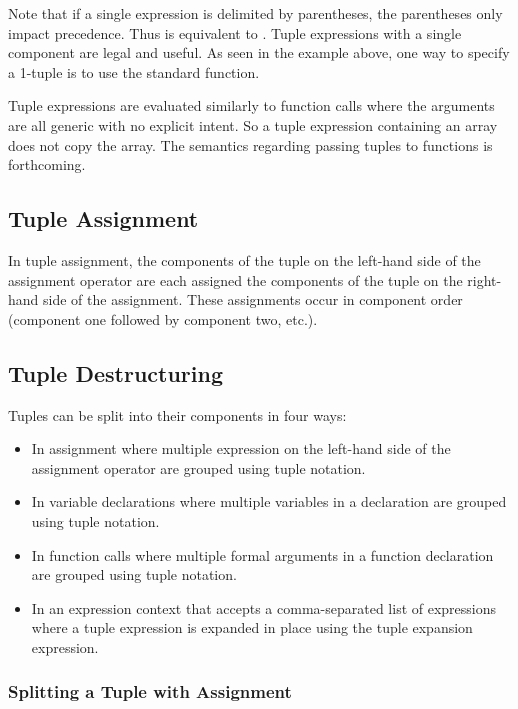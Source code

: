 Note that if a single expression is delimited by parentheses, the
parentheses only impact precedence.  Thus  is equivalent
to .  Tuple expressions with a single component are legal and
useful.  As seen in the example above, one way to specify a 1-tuple is
to use the standard  function.

Tuple expressions are evaluated similarly to function calls where the
arguments are all generic with no explicit intent.  So a tuple
expression containing an array does not copy the array.  The semantics
regarding passing tuples to functions is forthcoming.

\subsection{Tuple Assignment}
\label{Tuple_Assignment}

In tuple assignment, the components of the tuple on the left-hand side
of the assignment operator are each assigned the components of the
tuple on the right-hand side of the assignment.  These assignments
occur in component order (component one followed by component two,
etc.).

\subsection{Tuple Destructuring}
\label{Tuple_Destructuring}

Tuples can be split into their components in four ways:
\begin{itemize}
\item In assignment where multiple expression on the left-hand side of
the assignment operator are grouped using tuple notation.
\item In variable declarations where multiple variables in a
declaration are grouped using tuple notation.
\item In function calls where multiple formal arguments in a function
declaration are grouped using tuple notation.
\item In an expression context that accepts a comma-separated list of
expressions where a tuple expression is expanded in place using the
tuple expansion expression.
\end{itemize}

\subsubsection{Splitting a Tuple with Assignment}

